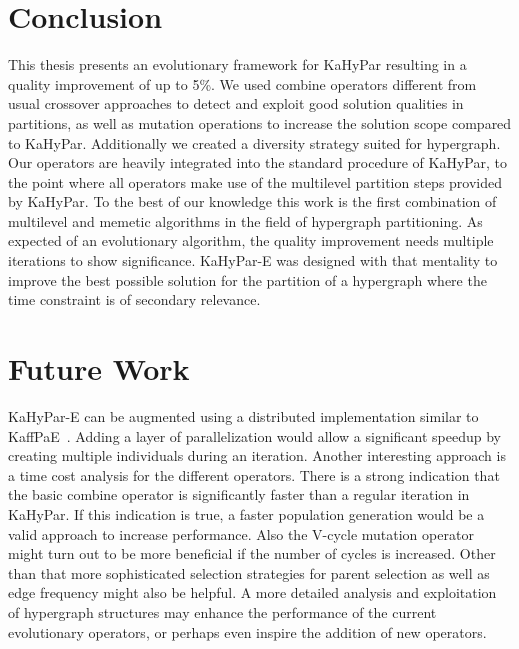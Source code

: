 \documentclass[a4paper,12pt,titlepage, BCOR7mm,headsepline]{scrbook}
\numberwithin{equation}{section}
\begin{document}
\section{Conclusion}
This thesis presents an evolutionary framework for KaHyPar resulting in a quality improvement of up to 5\%. We used combine operators different from usual crossover approaches to detect and exploit good solution qualities in partitions, as well as mutation operations to increase the solution scope compared to KaHyPar. Additionally we created a diversity strategy suited for hypergraph. Our operators are heavily integrated into the standard procedure of KaHyPar, to the point where all operators make use of the multilevel partition steps provided by KaHyPar. To the best of our knowledge this work is the first combination of multilevel and memetic algorithms in the field of hypergraph partitioning.
As expected of an evolutionary algorithm, the quality improvement needs multiple iterations to show significance. KaHyPar-E was designed with that mentality to improve the best possible solution for the partition of a hypergraph where the time constraint is of secondary relevance. 
\section{Future Work}
KaHyPar-E can be augmented using a distributed implementation similar to KaffPaE~\cite{sanders2012distributed}. Adding a layer of parallelization would allow a significant speedup by creating multiple individuals during an iteration. Another interesting approach is a time cost analysis for the different operators. There is a strong indication that the basic combine operator is significantly faster than a regular iteration in KaHyPar. If this indication is true, a faster population generation would be a valid approach to increase performance. Also the V-cycle mutation operator might turn out to be more beneficial if the number of cycles is increased. Other than that more sophisticated selection strategies for parent selection as well as edge frequency might also be helpful. A more detailed analysis and exploitation of hypergraph structures may enhance the performance of the current evolutionary operators, or perhaps even inspire the addition of new operators.
\end{document}
